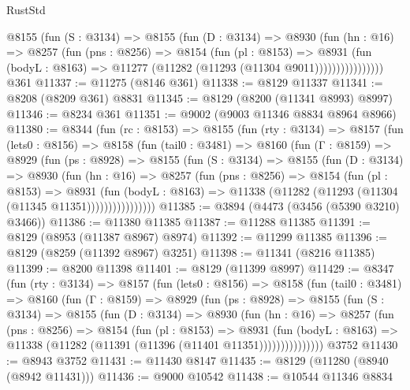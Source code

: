 \begin{lexlean}{RustStd}
\begin{coremodule}
                @8155
                  (fun (S : @3134) =>
                  @8155
                    (fun (D : @3134) =>
                    @8930
                      (fun (hn : @16) =>
                      @8257
                        (fun (pns : @8256) =>
                        @8154
                          (fun (pl : @8153) =>
                          @8931
                            (fun (bodyL : @8163) =>
                            @11277 (@11282 (@11293 (@11304 @9011))))))))))))))))
    @361
@11337 := @11275 (@8146 @361)
@11338 := @8129 @11337
@11341 := @8208 (@8209 @361) @8831
@11345 := @8129 (@8200 (@11341 @8993) @8997)
@11346 := @8234 @361
@11351 := @9002 (@9003 @11346 @8834 @8964 @8966)
@11380 := @8344
    (fun (rc : @8153) =>
    @8155
      (fun (rty : @3134) =>
      @8157
        (fun (lets0 : @8156) =>
        @8158
          (fun (tail0 : @3481) =>
          @8160
            (fun (Γ : @8159) =>
            @8929
              (fun (ps : @8928) =>
              @8155
                (fun (S : @3134) =>
                @8155
                  (fun (D : @3134) =>
                  @8930
                    (fun (hn : @16) =>
                    @8257
                      (fun (pns : @8256) =>
                      @8154
                        (fun (pl : @8153) =>
                        @8931
                          (fun (bodyL : @8163) =>
                          @11338 (@11282 (@11293 (@11304 (@11345 @11351))))))))))))))))
@11385 := @3894 (@4473 (@3456 (@5390 @3210) @3466))
@11386 := @11380 @11385
@11387 := @11288 @11385
@11391 := @8129 (@8953 (@11387 @8967) @8974)
@11392 := @11299 @11385
@11396 := @8129 (@8259 (@11392 @8967) @3251)
@11398 := @11341 (@8216 @11385)
@11399 := @8200 @11398
@11401 := @8129 (@11399 @8997)
@11429 := @8347
    (fun (rty : @3134) =>
    @8157
      (fun (lets0 : @8156) =>
      @8158
        (fun (tail0 : @3481) =>
        @8160
          (fun (Γ : @8159) =>
          @8929
            (fun (ps : @8928) =>
            @8155
              (fun (S : @3134) =>
              @8155
                (fun (D : @3134) =>
                @8930
                  (fun (hn : @16) =>
                  @8257
                    (fun (pns : @8256) =>
                    @8154
                      (fun (pl : @8153) =>
                      @8931
                        (fun (bodyL : @8163) =>
                        @11338 (@11282 (@11391 (@11396 (@11401 @11351)))))))))))))))
    @3752
@11430 := @8943 @3752
@11431 := @11430 @8147
@11435 := @8129 (@11280 (@8940 (@8942 @11431)))
@11436 := @9000 @10542
@11438 := @10544 @11346 @8834

\end{coremodule}
\end{lexlean}
